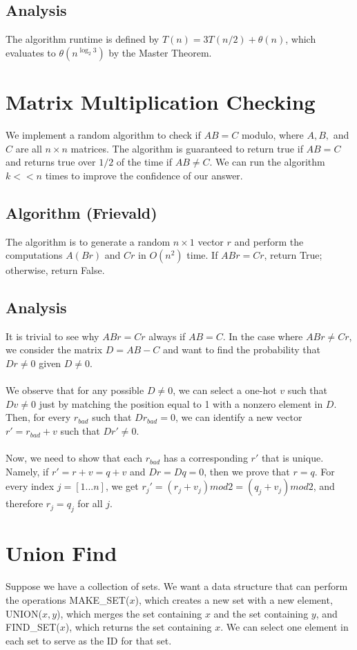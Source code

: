 \documentclass{article}
\begin{document}
\subsection*{Analysis}
The algorithm runtime is defined by $T(n) = 3 T(n/2) + \theta (n)$, which evaluates to $\theta(n^{\log_2 3})$ by the Master Theorem.
\section{Matrix Multiplication Checking}
We implement a random algorithm to check if $AB = C$ modulo, where $A, B,$ and $C$ are all $n \times n$ matrices. The algorithm is guaranteed to return true if $AB = C$ and returns true over $1/2$ of the time if $AB \neq C$. We can run the algorithm $k << n$ times to improve the confidence of our answer.
\subsection*{Algorithm (Frievald)}
The algorithm is to generate a random $n \times 1$ vector $r$ and perform the computations $A(Br)$ and $Cr$ in $O(n^2)$ time. If $ABr = Cr$, return True; otherwise, return False.
\subsection*{Analysis}
It is trivial to see why $ABr = Cr$ always if $AB = C$. In the case where $ABr \neq Cr$, we consider the matrix $D = AB - C$ and want to find the probability that $Dr \neq 0$ given $D \neq 0$.\\
\\
We observe that for any possible $D \neq 0$, we can select a one-hot $v$ such that $Dv \neq 0$ just by matching the position equal to 1 with a nonzero element in $D$. Then, for every $r_{bad}$ such that $D r_{bad} = 0$, we can identify a new vector $r' = r_{bad} + v$ such that $D r' \neq 0$.\\
\\
Now, we need to show that each $r_{bad}$ has a corresponding $r'$ that is unique. Namely, if $r' = r + v = q + v$ and $Dr = Dq = 0$, then we prove that $r = q$. For every index $j = [1...n]$, we get $r_j' = (r_j + v_j) mod 2 = (q_j + v_j) mod 2$, and therefore $r_j = q_j$ for all $j$.
\newpage
\section{Union Find}
Suppose we have a collection of sets. We want a data structure that can perform the operations MAKE\_SET($x$), which creates a new set with a new element, UNION($x, y$), which merges the set containing $x$ and the set containing $y$, and FIND\_SET($x$), which returns the set containing $x$. We can select one element in each set to serve as the ID for that set.
\end{document}
